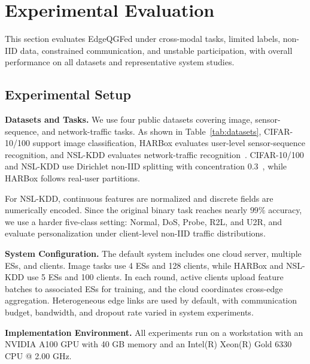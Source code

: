 ﻿\documentclass[10pt, conference, letterpaper]{ IEEEtran}
\begin{document}
\section{Experimental Evaluation}
\label{sec:evaluation}
This section evaluates EdgeQGFed under cross-modal tasks, limited labels, non-IID data, constrained communication, and unstable participation, with overall performance on all datasets and representative system studies.

\subsection{Experimental Setup}
\label{subsec:exp_setup}
\textbf{Datasets and Tasks.}
We use four public datasets covering image, sensor-sequence, and network-traffic tasks. As shown in Table~\ref{tab:datasets}, CIFAR-10/100 support image classification, HARBox evaluates user-level sensor-sequence recognition, and NSL-KDD evaluates network-traffic recognition~\cite{krizhevsky2009learning, ouyang2022clusterfl, tavallaee2009detailed}. CIFAR-10/100 and NSL-KDD use Dirichlet non-IID splitting with concentration 0.3~\cite{hsu2019measuring}, while HARBox follows real-user partitions.

For NSL-KDD, continuous features are normalized and discrete fields are numerically encoded. Since the original binary task reaches nearly $99\%$ accuracy, we use a harder five-class setting: Normal, DoS, Probe, R2L, and U2R, and evaluate personalization under client-level non-IID traffic distributions.

\textbf{System Configuration.}
The default system includes one cloud server, multiple ESs, and clients. Image tasks use 4 ESs and 128 clients, while HARBox and NSL-KDD use 5 ESs and 100 clients. In each round, active clients upload feature batches to associated ESs for training, and the cloud coordinates cross-edge aggregation. Heterogeneous edge links are used by default, with communication budget, bandwidth, and dropout rate varied in system experiments.

\textbf{Implementation Environment.}
All experiments run on a workstation with an NVIDIA A100 GPU with 40 GB memory and an Intel(R) Xeon(R) Gold 6330 CPU @ 2.00 GHz.
\end{document}
